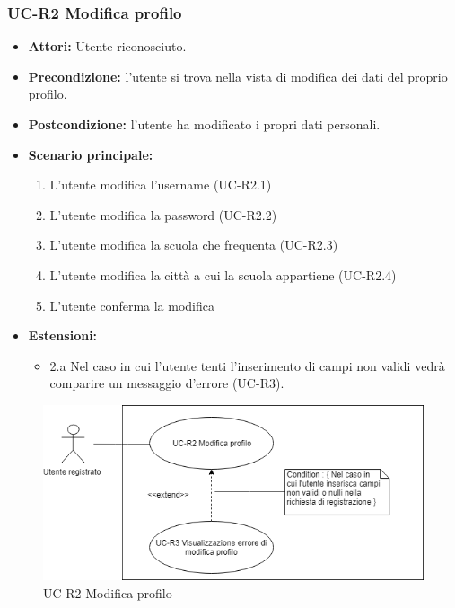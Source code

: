 \subsubsection{UC-R2 Modifica profilo}
		\begin{itemize}
			\item \textbf{Attori:} Utente riconosciuto.
			\item \textbf{Precondizione:} l'utente si trova nella vista di modifica dei dati del proprio profilo.
			\item \textbf{Postcondizione:} l'utente ha modificato i propri dati personali.
			\item \textbf{Scenario principale:}
				\begin{enumerate}
					\item L'utente modifica l'username (UC-R2.1)
					\item  L'utente modifica la password (UC-R2.2)
					\item L'utente modifica la scuola che frequenta (UC-R2.3) 
					\item L'utente modifica la città a cui la scuola appartiene (UC-R2.4)
					\item L'utente conferma la modifica
				\end{enumerate}
				\item \textbf{Estensioni:}
				\begin{itemize}
					\item 2.a Nel caso in cui l'utente tenti l'inserimento di campi non validi vedrà comparire un messaggio d'errore (UC-R3).
				\end{itemize}
		\end{itemize}
		\begin{figure}[htbp]
			\centering
			\includegraphics[scale=0.7]{images/UC-R2.png}
			\caption{UC-R2 Modifica profilo}
		\end{figure}
